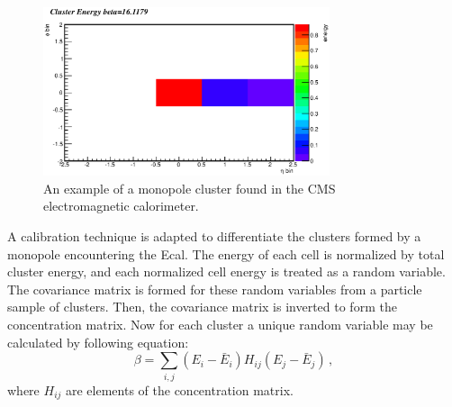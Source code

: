 \begin{figure}[h]
\centering
\includegraphics[width=0.75\textwidth]{plots/monoCluster.eps}
\caption{An example of a monopole cluster found in the CMS electromagnetic calorimeter.}
\label{fig:MonoCluster}
\end{figure}

A calibration technique is adapted to differentiate the clusters 
formed by a monopole encountering the Ecal.  The energy of each cell is normalized by 
total cluster energy, and each normalized cell energy is treated as a random variable.
The covariance matrix is formed for these random variables from a particle sample of clusters.
Then, the covariance matrix is inverted to form the concentration matrix.  
Now for each cluster a unique random variable may be calculated by following equation:
\begin{equation}
\beta = \sum_{i,j} (E_i-\bar{E}_i) H_{ij} (E_j-\bar{E}_j)\,,
\label{eq:beta}
\end{equation}
where $H_{ij}$ are elements of the concentration matrix.

